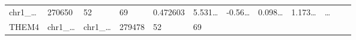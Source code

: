 \documentclass[
]{article}
\begin{document}
\begin{longtable}[]{@{}llllllllllll@{}}
\begin{minipage}[t]{0.06\columnwidth}
chr1\_\ldots{}\strut
\end{minipage} & \begin{minipage}[t]{0.06\columnwidth}\raggedright
270650\strut
\end{minipage} & \begin{minipage}[t]{0.06\columnwidth}\raggedright
52\strut
\end{minipage} & \begin{minipage}[t]{0.06\columnwidth}\raggedright
69\strut
\end{minipage} & \begin{minipage}[t]{0.06\columnwidth}\raggedright
0.472603\strut
\end{minipage} & \begin{minipage}[t]{0.08\columnwidth}\raggedright
5.531\ldots{}\strut
\end{minipage} & \begin{minipage}[t]{0.06\columnwidth}\raggedright
-0.56\ldots{}\strut
\end{minipage} & \begin{minipage}[t]{0.06\columnwidth}\raggedright
0.098\ldots{}\strut
\end{minipage} & \begin{minipage}[t]{0.09\columnwidth}\raggedright
1.173\ldots{}\strut
\end{minipage} & \begin{minipage}[t]{0.02\columnwidth}\raggedright
\ldots{}\strut
\end{minipage}\tabularnewline
\begin{minipage}[t]{0.06\columnwidth}\raggedright
THEM4\strut
\end{minipage} & \begin{minipage}[t]{0.06\columnwidth}\raggedright
chr1\_\ldots{}\strut
\end{minipage} & \begin{minipage}[t]{0.06\columnwidth}\raggedright
chr1\_\ldots{}\strut
\end{minipage} & \begin{minipage}[t]{0.06\columnwidth}\raggedright
279478\strut
\end{minipage} & \begin{minipage}[t]{0.06\columnwidth}\raggedright
52\strut
\end{minipage} & \begin{minipage}[t]{0.06\columnwidth}\raggedright
69\strut
\end{minipage} & \begin{minipage}[t]{0.06\columnwidth}\raggedright

\end{minipage}
\end{longtable}
\end{document}
